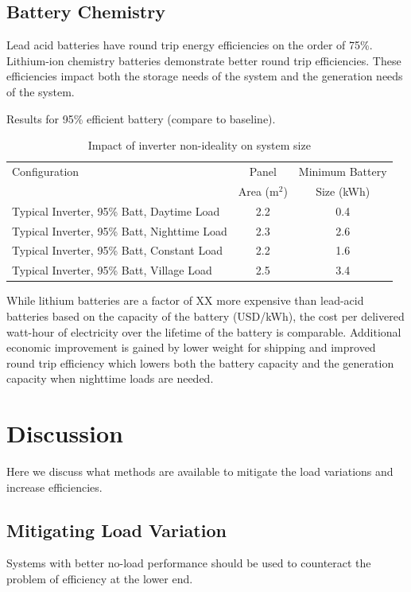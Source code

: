 \documentclass[conference]{IEEEtran}
\begin{document}
\subsection{Battery Chemistry}

Lead acid batteries have round trip energy efficiencies on the
order of 75\%.
Lithium-ion chemistry batteries demonstrate better round trip
efficiencies.
These efficiencies impact both the storage needs of the system
and the generation needs of the system.

Results for 95\% efficient battery (compare to baseline).

\begin{table}
\centering
\begin{tabular}{@{} p{}
                @{} c
                @{} c @{}}
Configuration & Panel          & Minimum Battery \\
              & Area (m$^2$)   & Size (kWh)      \\
\hline
Typical Inverter, 95\% Batt, Daytime Load   & 2.2 & 0.4 \\
Typical Inverter, 95\% Batt, Nighttime Load & 2.3 & 2.6 \\
Typical Inverter, 95\% Batt, Constant Load  & 2.2 & 1.6 \\
Typical Inverter, 95\% Batt, Village Load   & 2.5 & 3.4 \\
\end{tabular}
\caption{Impact of inverter non-ideality on system size}
\label{sizetable}
\end{table}


While lithium batteries are a factor of XX more expensive
than lead-acid batteries based on the capacity of the battery
(USD/kWh), the cost per delivered watt-hour of electricity
over the lifetime of the battery is comparable.
Additional economic improvement is gained by lower weight
for shipping and improved round trip efficiency which lowers
both the battery capacity and the generation capacity when nighttime
loads are needed.

\section{Discussion}
Here we discuss what methods are available to mitigate the
load variations and increase efficiencies.

\subsection{Mitigating Load Variation}
Systems with better no-load performance should be used to counteract
the problem of efficiency at the lower end.
\end{document}
